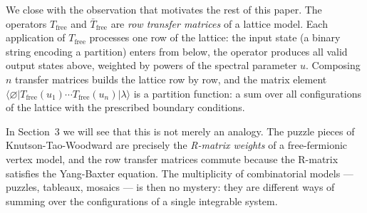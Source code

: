 We close with the observation that motivates the rest of this paper.
The operators $T_{\mathrm{free}}$ and $\bar{T}_{\mathrm{free}}$ are
\emph{row transfer matrices} of a lattice model.  Each application of
$T_{\mathrm{free}}$ processes one row of the lattice: the input state
(a binary string encoding a partition) enters from below, the operator
produces all valid output states above, weighted by powers of the
spectral parameter $u$.  Composing $n$ transfer matrices builds the
lattice row by row, and the matrix element
$\langle\varnothing|T_{\mathrm{free}}(u_1) \cdots
T_{\mathrm{free}}(u_n)|\lambda\rangle$ is a partition function: a sum
over all configurations of the lattice with the prescribed boundary
conditions.

In Section~3 we will see that this is not merely an analogy.  The
puzzle pieces of Knutson-Tao-Woodward are precisely the
\emph{R-matrix weights} of a free-fermionic vertex model, and the row
transfer matrices commute because the R-matrix satisfies the
Yang-Baxter equation.  The multiplicity of combinatorial models ---
puzzles, tableaux, mosaics --- is then no mystery: they are different
ways of summing over the configurations of a single integrable system.

